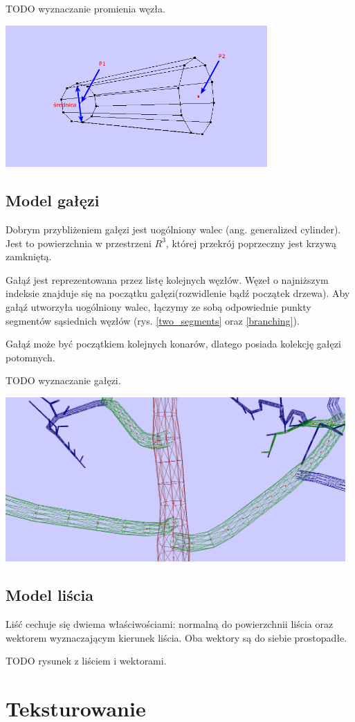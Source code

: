 TODO wyznaczanie promienia węzła.

\begin{center}
	\includegraphics[width=100mm]{images/model/two_segments.png}
	\label{two_segments}
\end{center}

\subsection{Model gałęzi}
Dobrym przybliżeniem gałęzi jest uogólniony walec (ang. generalized cylinder). Jest to powierzchnia w przestrzeni $R^3$, której przekrój poprzeczny jest krzywą zamkniętą.

Gałąź jest reprezentowana przez listę kolejnych węzłów. Węzeł o najniższym indeksie znajduje się na początku gałęzi(rozwidlenie bądź początek drzewa). Aby gałąź utworzyła uogólniony walec, łączymy ze sobą odpowiednie punkty segmentów sąsiednich węzłów (rys. \ref{two_segments} oraz \ref{branching}).

Gałąź może być początkiem kolejnych konarów, dlatego posiada kolekcję gałęzi potomnych.

TODO wyznaczanie gałęzi.

\begin{center}
	\includegraphics[width=130mm]{images/model/branching.png}
	\label{branching}
\end{center}
\subsection{Model liścia}
Liść cechuje się dwiema właściwościami: normalną do powierzchnii liścia oraz wektorem wyznaczającym kierunek liścia. Oba wektory są do siebie prostopadłe.

TODO rysunek z liściem i wektorami.

\section{Teksturowanie}
